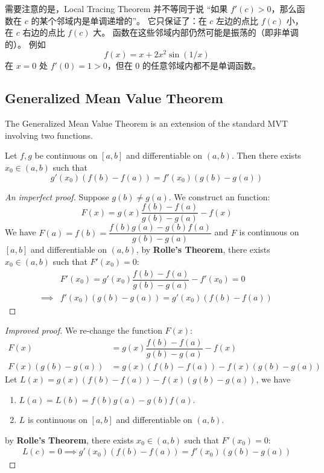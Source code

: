 \documentclass[
	UTF-8,
	11pt, %
	a4paper, %
]{LegrandOrangeBook}
\begin{document}
    \begin{remark}
    需要注意的是，Local Tracing Theorem 并不等同于说
    “如果 $f'(c) > 0$，那么函数在 $c$ 的某个邻域内是单调递增的”。
    它只保证了：在 $c$ 左边的点比 $f(c)$ 小，在 $c$ 右边的点比 $f(c)$ 大。
    函数在这些邻域内部仍然可能是振荡的（即非单调的）。
    例如 
    $$f(x) = x + 2x^2 \sin(1/x)$$ 
    在 $x=0$ 处 $f'(0)=1 > 0$，但在 0 的任意邻域内都不是单调函数。
    \end{remark}

    \newpage

    \subsection{Generalized Mean Value Theorem}

    The Generalized Mean Value Theorem is an extension of the standard MVT involving two functions.

    \begin{theorem}
    Let $f, g$ be continuous on $[a, b]$ and differentiable on $(a, b)$. Then there exists $x_0 \in (a, b)$ such that
    \[ g'(x_0)(f(b) - f(a)) = f'(x_0)(g(b) - g(a)) \]
    \end{theorem}

    \begin{proof}[An imperfect proof]
    Suppose $g(b) \ne g(a)$. We construct an function:
    \[ F(x) = g(x) \dfrac{f(b)-f(a)}{g(b)-g(a)} - f(x) \]
    We have $F(a) = f(b) = \dfrac{f(b)g(a) - g(b)f(a)}{g(b) - g(a)}$ and $F$ is continuous 
    on $[a, b]$ and differentiable on $(a, b)$, by \textbf{Rolle's Theorem}, 
    there exists $x_0 \in (a, b)$ such that $F'(x_0) = 0$:
    $$
    \begin{aligned}
            &F'(x_0) = g'(x_0) \dfrac{f(b)-f(a)}{g(b)-g(a)} - f'(x_0) = 0 \\
    \implies &f'(x_0)(g(b) - g(a)) = g'(x_0)(f(b) - f(a))
    \end{aligned}
    $$
    \end{proof}

    \begin{proof}[Improved proof]
    We re-change the function $F(x)$:
    $$
    \begin{aligned}
            F(x) &= g(x) \dfrac{f(b)-f(a)}{g(b)-g(a)} - f(x)\\
            F(x)(g(b)-g(a)) &= g(x) (f(b)-f(a)) - f(x)(g(b)-g(a))
    \end{aligned}
    $$
    Let $L(x) = g(x) (f(b)-f(a)) - f(x)(g(b)-g(a))$, 
    we have
    \begin{enumerate}
        \item $L(a) = L(b) = f(b)g(a) - g(b)f(a)$.
        \item $L$ is continuous on $[a, b]$ and differentiable on $(a, b)$.
    \end{enumerate}
    by \textbf{Rolle's Theorem}, 
    there exists $x_0 \in (a, b)$ such that $F'(x_0) = 0$:
    $$
    \begin{aligned}
            L(c) = 0 \implies g'(x_0)(f(b) - f(a)) = f'(x_0)(g(b) - g(a))
    \end{aligned}
    $$
    \end{proof}
\end{document}
